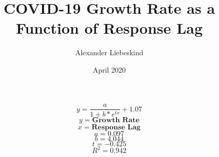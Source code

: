 \documentclass{article}
\title{COVID-19 Growth Rate as a Function of Response Lag}
\author{Alexander Liebeskind}
\date{April 2020}
\begin{document}
\maketitle

$$y = \frac{a}{1+b*e^{tx}}+1.07$$
$$y = \textbf{Growth Rate}$$
$$x = \textbf{Response Lag}$$
$$a = 0.097$$
$$b = 4.044$$
$$t = -0.425$$
$$R^2 = 0.942$$
\end{document}
